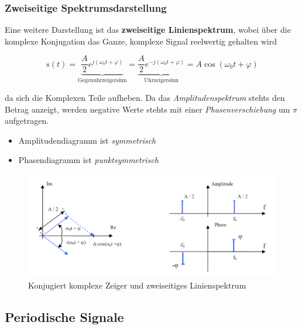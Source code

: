 \documentclass[
  10pt,
  a4paper,
  german]{article}
\numberwithin{equation}{section}
\begin{document}
\hypertarget{zweiseitige-spektrumsdarstellung}{%
\subsubsection{Zweiseitige
Spektrumsdarstellung}\label{zweiseitige-spektrumsdarstellung}}

Eine weitere Darstellung ist das \textbf{zweiseitige Linienspektrum},
wobei über die komplexe Konjugation das Ganze, komplexe Signal
reelwertig gehalten wird

\[
s(t)=\underbrace{\frac{A}{2}e^{j(\omega_0 t+\varphi)}}_{\text{Gegenuhrzeigersinn}}=\underbrace{\frac{A}{2}e^{-j(\omega_0 t+\varphi)}}_{\text{Uhrzeigersinn}}=A\cos(\omega_0 t+\varphi)
\]

da sich die Komplexen Teile aufheben. Da das \emph{Amplitudenspektrum}
stehts den Betrag anzeigt, werden negative Werte stehts mit einer
\emph{Phasenverschiebung} um \(\pi\) aufgetragen.

\begin{itemize}
\item
  Amplitudendiagramm ist \emph{symmetrisch}
\item
  Phasendiagramm ist \emph{punktsymmetrisch}
\end{itemize}

\begin{figure}[H]

{\centering \includegraphics{images/02_AmpUndPhasenSpektrumZweiseitig.png}

}

\caption{Konjugiert komplexe Zeiger und zweiseitiges Linienspektrum}

\end{figure}

\hypertarget{periodische-signale}{%
\subsection{Periodische Signale}\label{periodische-signale}}
\end{document}
